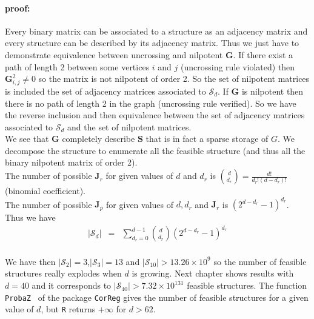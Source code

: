 \documentclass[12pt,a4paper]{report}
\begin{document}
	\paragraph{proof:} Every binary matrix can be associated to a structure as an adjacency matrix and every structure can be described by its adjacency matrix. Thus we just have to demonstrate equivalence between uncrossing and nilpotent $\boldsymbol{G}$. If there exist a path of length 2 between some vertices $i$ and $j$ (uncrossing rule violated) then $\boldsymbol{G}^2_{i,j}\neq 0$ so the matrix is not nilpotent of order 2. So the set of nilpotent matrices is included the set of adjacency matrices associated to $\mathcal{S}_d$. If $\boldsymbol{G}$ is nilpotent then there is no path of length 2 in the graph (uncrossing rule verified). So we have the reverse inclusion and then equivalence between the set of adjacency matrices associated to $\mathcal{S}_d$ and the set of nilpotent matrices.\\
	
	We see that $\boldsymbol{G}$ completely describe $\boldsymbol{S}$ that is in fact a sparse storage of $G$.
	We decompose the structure to enumerate all the feasible structure (and thus all the binary nilpotent matrix of order 2).\\
	
	

			The number of possible $\boldsymbol{J}_r$ for given values of $d$ and $d_r$ is ${d \choose d_r}=\frac{d!}{d_r!(d-d_r)!}$ (binomial coefficient).\\
	
			The number of possible $\boldsymbol{J}_p$ for given values of $d, d_r$ and $\boldsymbol{J}_r$ is $(2^{d-d_r}-1)^{d_r}$.\\
			
			Thus we have
			\begin{eqnarray}
		|\mathcal{S}_d|&=&%
		 \sum_{d_r=0}^{d-1}{d \choose d_r}(2^{d-d_r}-1)^{d_r}
	\end{eqnarray}
	 \\
	We have then $|\mathcal{S}_2| =3 $,$|\mathcal{S}_3| =13 $ and $|\mathcal{S}_{10}| >13.26\times10^9 $ so the number of feasible structures really explodes when $d$ is growing. Next chapter shows results with $d=40$ and it corresponds to $|\mathcal{S}_{40}| >7.32\times10^{131} $ feasible structures. The function {\tt ProbaZ } of the package { \tt CorReg} gives the number of feasible structures for a given value of $d$, but {\tt R} returns $+\infty$ for $d>62$.\\
\end{document}
